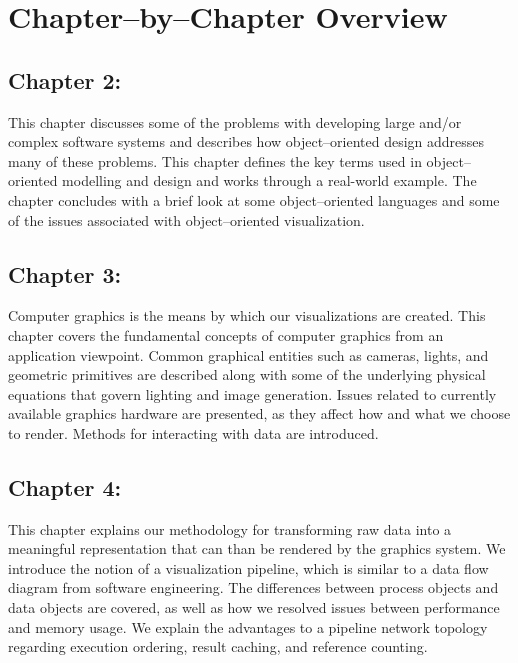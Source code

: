 \section{Chapter--by--Chapter Overview}

\subsection*{Chapter 2: }

This chapter discusses some of the problems with developing large and/or complex software systems and describes how object--oriented design addresses many of these problems. This chapter defines the key terms used in object--oriented modelling and design and works through a real-world example. The chapter concludes with a brief look at some object--oriented languages and some of the issues associated with object--oriented visualization.

\subsection*{Chapter 3: }

Computer graphics is the means by which our visualizations are created. This chapter covers the fundamental concepts of computer graphics from an application viewpoint. Common graphical entities such as cameras, lights, and geometric primitives are described along with some of the underlying physical equations that govern lighting and image generation. Issues related to currently available graphics hardware are presented, as they affect how and what we choose to render. Methods for interacting with data are introduced.

\subsection*{Chapter 4: }

This chapter explains our methodology for transforming raw data into a meaningful representation that can than be rendered by the graphics system. We introduce the notion of a visualization pipeline, which is similar to a data flow diagram from software engineering. The differences between process objects and data objects are covered, as well as how we resolved issues between performance and memory usage. We explain the advantages to a pipeline network topology regarding execution ordering, result caching, and reference counting.

